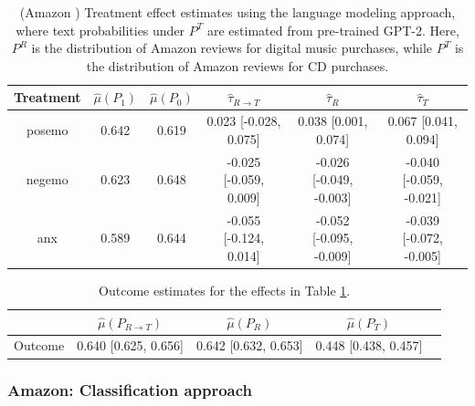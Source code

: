 \documentclass{article}
\begin{document}
\begin{table}[!ht]
    \centering
    \begin{tabular}{c|ccccc}
    \toprule
    Treatment   &   $\hat{\mu}(P_1)$ &   $\hat{\mu}(P_0)$ & $\hat{\tau}_{R \rightarrow T}$   & $\hat{\tau}_R$          & $\hat{\tau}_T$          \\
    \midrule
    posemo      &              0.642 &              0.619 & 0.023 [-0.028, 0.075]            & 0.038 [0.001, 0.074]    & 0.067 [0.041, 0.094]    \\
    negemo      &              0.623 &              0.648 & -0.025 [-0.059, 0.009]           & -0.026 [-0.049, -0.003] & -0.040 [-0.059, -0.021] \\
    anx         &              0.589 &              0.644 & -0.055 [-0.124, 0.014]           & -0.052 [-0.095, -0.009] & -0.039 [-0.072, -0.005] \\
    \bottomrule
    \end{tabular}
    \caption{(Amazon \cite{przyant2021causal}) Treatment effect estimates using the language modeling approach, where text probabilities under $P^T$ are estimated from pre-trained GPT-2. Here, $P^R$ is the distribution of Amazon reviews for digital music purchases, while $P^T$ is the distribution of Amazon reviews for CD purchases.}
    \label{tab:results_clm_gpt2_amazon_pryzant}
\end{table}

\begin{table}[!ht]
    \centering
    \begin{tabular}{c|cccc}
    \toprule
    & $\hat{\mu}(P_{R \rightarrow T})$   & $\hat{\mu}(P_R)$     & $\hat{\mu}(P_T)$     \\
    \midrule
    Outcome & 0.640 [0.625, 0.656]               & 0.642 [0.632, 0.653] & 0.448 [0.438, 0.457] \\ 
    \bottomrule
    \end{tabular}
    \caption{Outcome estimates for the effects in Table \ref{tab:results_clm_gpt2_amazon_pryzant}.}
    \label{tab:results_clm_gpt2_amazon_pryzant_outcome}
\end{table}

\newpage
\subsubsection{Amazon: Classification approach}
\end{document}
